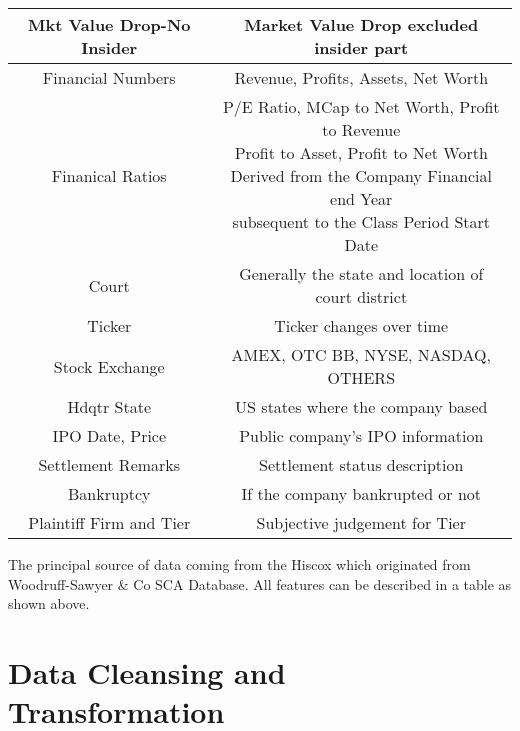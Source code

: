 \begin{table}[H]
\begin{center}
\begin{tabular}{ | c  | c |}
\hline
\rowcolor{Gray}
Mkt Value Drop-No Insider & Market Value Drop excluded insider part\\
\hline
Financial Numbers & Revenue, Profits, Assets, Net Worth\\
\hline
\rowcolor{Gray}
Finanical Ratios & \makecell{P/E Ratio, MCap to Net Worth, Profit to Revenue\\ Profit to Asset, Profit to Net Worth\\Derived from the Company Financial end Year\\ subsequent to the Class Period Start Date}\\
\hline
Court & Generally the state and location of court district\\
\hline
\rowcolor{Gray}
Ticker & Ticker changes over time\\
\hline
Stock Exchange & AMEX, OTC BB, NYSE, NASDAQ, OTHERS\\
\hline
\rowcolor{Gray}
Hdqtr State & US states where the company based \\
\hline
IPO Date, Price & Public company's IPO information\\
\hline
\rowcolor{Gray}
Settlement Remarks & Settlement status description\\
\hline
Bankruptcy & If the company bankrupted or not\\
\hline
\rowcolor{Gray}
Plaintiff Firm and Tier & Subjective judgement for Tier\\
\hline
\end{tabular}
\end{center}
\end{table}
The principal source of data coming from the Hiscox which originated from Woodruff-Sawyer \& Co SCA Database. All features can be described in a table as shown above.

\section{Data Cleansing and Transformation}
